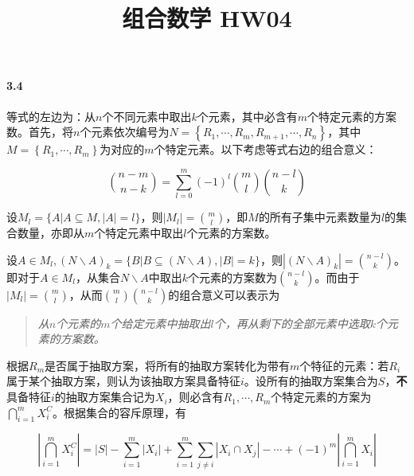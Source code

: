 \documentclass{../notes}
\title{组合数学 HW04}
\begin{document}
    \maketitle

    \paragraph*{3.4}

    \begin{subquestions}
        \item 等式的左边为：从$n$个不同元素中取出$k$个元素，其中必含有$m$个特定元素的方案数。首先，将$n$个元素依次编号为$N = \left\{R_1, \cdots, R_m, R_{m+1}, \cdots, R_n\right\}$，其中$M = \left\{R_1, \cdots, R_m\right\}$为对应的$m$个特定元素。以下考虑等式右边的组合意义：

        \begin{equation}
            \binom{n-m}{n-k} = \sum_{l=0}^m(-1)^l \binom{m}{l}\binom{n-l}{k}
            \label{eq:3.4.1}
        \end{equation}

        设$M_l = \{A | A\subseteq M, |A| = l\}$，则$|M_l| = \binom{m}{l}$，即$M$的所有子集中元素数量为$l$的集合数量，亦即从$m$个特定元素中取出$l$个元素的方案数。

        设$A\in M_l, (N\backslash A)_{k} = \{B|B\subseteq (N\backslash A), |B| = k\}$，则$\left|(N\backslash A)_{k}\right| = \binom{n-l}{k}$。即对于$A\in M_l$，从集合$N\backslash A$中取出$k$个元素的方案数为$\binom{n-l}{k}$。而由于$|M_l| = \binom{m}{l}$，从而$\binom{m}{l}\binom{n-l}{k}$的组合意义可以表示为

        \begin{quote}
            \textit{
            从$n$个元素的$m$个给定元素中抽取出$l$个，再从剩下的全部元素中选取$k$个元素的方案数。
            }
        \end{quote}

        根据$R_m$是否属于抽取方案，将所有的抽取方案转化为带有$m$个特征的元素：若$R_i$属于某个抽取方案，则认为该抽取方案具备特征$i$。设所有的抽取方案集合为$S$，\textbf{不}具备特征$i$的抽取方案集合记为$X_i$，则必含有$R_1, \cdots, R_m$个特定元素的方案为$\bigcap_{i=1}^mX_i^C$。根据集合的容斥原理，有

        \begin{equation}
            \left|\bigcap_{i=1}^mX_i^C\right| = |S| - \sum_{i=1}^m\left|X_i\right| + \sum_{i=1}^m\sum_{j\not = i}\left|X_i\cap X_j\right| - \cdots + (-1)^m\left|\bigcap_{i=1}^m X_i\right|
            \label{eq:3.4.2}
        \end{equation}


\end{subquestions}
\end{document}
